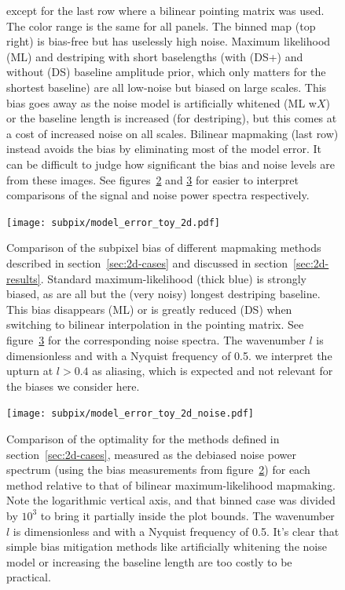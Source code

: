 \documentclass[twocolumn,apj]{aastex63}
\begin{document}
\begin{figure}[p]
{		except for the last row where a bilinear pointing matrix was used.
		The color range is the same for all panels.
		The binned map (top right) is bias-free but has uselessly high noise. Maximum likelihood (ML)
		and destriping with short baselengths (with (DS+) and without (DS) baseline amplitude prior,
		which only matters for the shortest baseline)
		are all low-noise but biased on large scales. This bias goes away as the noise model
		is artificially whitened (ML w$X$) or the baseline length is increased (for destriping),
		but this comes at a cost of increased noise on all scales.
		Bilinear mapmaking (last row) instead avoids the bias by eliminating most of the model error.
		It can be difficult to judge how significant the bias and noise levels are from
		these images. See figures~\ref{fig:2d-bias} and \ref{fig:2d-noise} for easier to
		interpret comparisons of the signal and noise power spectra respectively.
	}
	\label{fig:2d-maps}
\end{figure}

\begin{figure}
	\centering
	\hspace*{-5mm}\texttt{[image: subpix/model\_error\_toy\_2d.pdf]}
	\caption{
		Comparison of the subpixel bias of different mapmaking methods
		described in section~\ref{sec:2d-cases} and discussed in section~\ref{sec:2d-results}.
		Standard maximum-likelihood (thick blue) is strongly biased, as are all but
		the (very noisy) longest destriping baseline. This bias disappears (ML)
		or is greatly reduced (DS) when switching to bilinear interpolation in the pointing matrix.
		See figure~\ref{fig:2d-noise} for the corresponding noise spectra.
		The wavenumber $l$ is dimensionless and with a Nyquist frequency of 0.5.
		we interpret the upturn at $l>0.4$ as aliasing, which
		is expected and not relevant for the biases we consider here.
	}
	\label{fig:2d-bias}
\end{figure}

\begin{figure}[h!]
	\centering
	\hspace*{-5mm}\texttt{[image: subpix/model\_error\_toy\_2d\_noise.pdf]}
	\caption{
		Comparison of the optimality for the methods defined in section~\ref{sec:2d-cases}, measured
		as the debiased noise power spectrum (using the bias measurements from figure~\ref{fig:2d-bias})
		for each method relative to that of bilinear maximum-likelihood mapmaking.
		Note the logarithmic vertical axis, and that binned case was divided by $10^3$
		to bring it partially inside the plot bounds.
		The wavenumber $l$ is dimensionless and with a Nyquist frequency of 0.5.
		It's clear that simple bias mitigation
		methods like artificially whitening the noise model or increasing the
		baseline length are too costly to be practical.
	}
	\label{fig:2d-noise}
\end{figure}
\end{document}
